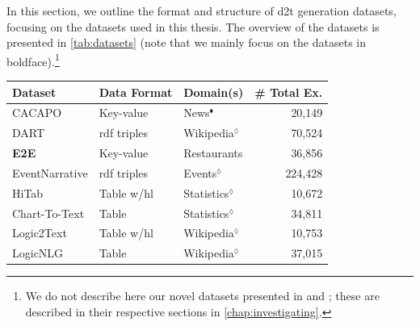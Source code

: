 {In this section, we outline the format and structure of \ac{d2t} generation datasets, focusing on the datasets used in this thesis. The overview of the datasets is presented in \autoref{tab:datasets} (note that we mainly focus on the datasets in boldface).\footnote{We do not describe here our novel datasets presented in \citet{kasnerMindLabelsDescribing2022} and \citet{kasnerReferenceBasedMetricsAnalyzing2024}; these are described in their respective sections in \autoref{chap:investigating}.}

\begin{table}[t]
    \centering\small
    \begin{tabular}{@{}lllr@{}}
        \toprule
        \textbf{Dataset}                                                                           & \textbf{Data Format} & \textbf{Domain(s)}      & \textbf{\# Total Ex.} \\  \midrule
        CACAPO \cite{vanderleeCACAPODatasetMultilingual2020}                                       & Key-value            & News$^\blacklozenge$    & 20,149                \\
        DART \cite{nan2021dart}                                                                    & \acs{rdf} triples    & Wikipedia$^\lozenge$    & 70,524                \\
        \textbf{E2E} \cite{dusekSemanticNoiseMatters2019,dusekEvaluatingStateoftheartEndtoEnd2020} & Key-value            & Restaurants             & 36,856                \\
        EventNarrative \cite{colas2021eventnarrative}                                              & \acs{rdf} triples    & Events$^\lozenge$       & 224,428               \\
        HiTab \cite{chengHiTabHierarchicalTable2021}                                               & Table w/hl           & Statistics$^\lozenge$   & 10,672                \\
        Chart-To-Text \cite{kantharajCharttoTextLargeScaleBenchmark2022}                           & Table                & Statistics$^\lozenge$   & 34,811                \\
        Logic2Text \cite{chenLogic2TextHighFidelityNatural2020}                                    & Table w/hl           & Wikipedia$^\lozenge$    & 10,753                \\
        LogicNLG \cite{chenLogicalNaturalLanguage2020}                                             & Table                & Wikipedia$^\lozenge$    & 37,015                \\

\end{tabular}
\end{table}}
